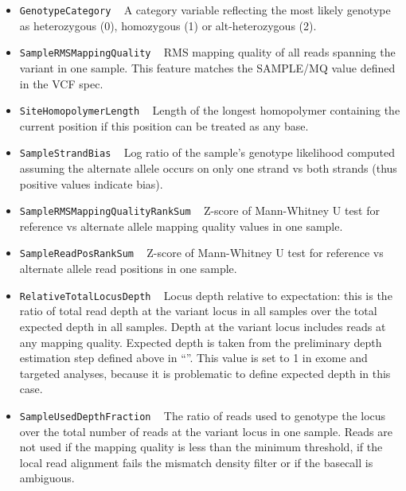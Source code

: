 \documentclass{article}
\begin{document}
\begin{itemize}

\item \texttt{GenotypeCategory} ~ A category variable reflecting the most likely genotype as heterozygous (0), homozygous (1) or alt-heterozygous (2).

\item \texttt{SampleRMSMappingQuality} ~ RMS mapping quality of all reads spanning the variant in one sample. This feature matches the SAMPLE/MQ value defined in the VCF spec.

\item \texttt{SiteHomopolymerLength} ~ Length of the longest homopolymer containing the current position if this position can be treated as any base.

\item \texttt{SampleStrandBias} ~ Log ratio of the sample's genotype likelihood computed assuming the alternate allele occurs on only one strand vs both strands (thus positive values indicate bias).

\item \texttt{SampleRMSMappingQualityRankSum} ~ Z-score of Mann-Whitney U test for reference vs alternate allele mapping quality values in one sample.

\item \texttt{SampleReadPosRankSum} ~ Z-score of Mann-Whitney U test for reference vs alternate allele read positions in one sample.

\item \texttt{RelativeTotalLocusDepth} ~ Locus depth relative to expectation: this is the ratio of total read depth at the variant locus in all samples over the total expected depth in all samples. Depth at the variant locus includes reads at any mapping quality. Expected depth is taken from the preliminary depth estimation step defined above in ``''. This value is set to 1 in exome and targeted analyses, because it is problematic to define expected depth in this case.

\item \texttt{SampleUsedDepthFraction} ~ The ratio of reads used to genotype the locus over the total number of reads at the variant locus in one sample. Reads are not used if the mapping quality is less than the minimum threshold, if the local read alignment fails the mismatch density filter or if the basecall is ambiguous.


\end{itemize}
\end{document}
